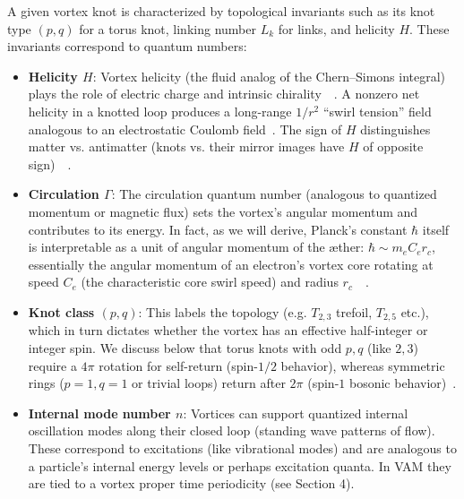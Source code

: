 \documentclass[a4paper,12pt]{article}
\begin{document}
    A given vortex knot is characterized by topological invariants such as its knot type $(p,q)$ for a torus knot, linking number $L_k$ for links, and helicity $H$. These invariants correspond to quantum numbers:
    \begin{itemize}
        \item \textbf{Helicity $H$}: Vortex helicity (the fluid analog of the Chern–Simons integral) plays the role of electric charge and intrinsic chirality~\cite{reference_32}~\cite{reference_33}. A nonzero net helicity in a knotted loop produces a long-range $1/r^2$ “swirl tension” field analogous to an electrostatic Coulomb field~\cite{reference_34}. The sign of $H$ distinguishes matter vs. antimatter (knots vs. their mirror images have $H$ of opposite sign)~\cite{reference_35}~\cite{reference_36}.
        \item \textbf{Circulation $\Gamma$}: The circulation quantum number (analogous to quantized momentum or magnetic flux) sets the vortex’s angular momentum and contributes to its energy. In fact, as we will derive, Planck’s constant $\hbar$ itself is interpretable as a unit of angular momentum of the æther: $\hbar \sim m_e C_e r_c$, essentially the angular momentum of an electron’s vortex core rotating at speed $C_e$ (the characteristic core swirl speed) and radius $r_c$~\cite{reference_37}~\cite{reference_38}.
        \item \textbf{Knot class $(p,q)$}: This labels the topology (e.g. $T_{2,3}$ trefoil, $T_{2,5}$ etc.), which in turn dictates whether the vortex has an effective half-integer or integer spin. We discuss below that torus knots with odd $p,q$ (like $2,3$) require a $4\pi$ rotation for self-return (spin-$1/2$ behavior), whereas symmetric rings ($p=1,q=1$ or trivial loops) return after $2\pi$ (spin-$1$ bosonic behavior)~\cite{reference_39}.
        \item \textbf{Internal mode number $n$}: Vortices can support quantized internal oscillation modes along their closed loop (standing wave patterns of flow). These correspond to excitations (like vibrational modes) and are analogous to a particle’s internal energy levels or perhaps excitation quanta. In VAM they are tied to a vortex proper time periodicity (see Section 4).
    \end{itemize}
\end{document}
